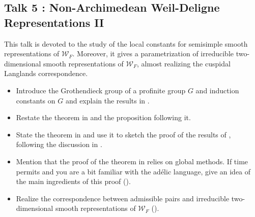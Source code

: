 \documentclass[11pt]{amsart}
\begin{document}
\subsection{Talk 5 : Non-Archimedean Weil-Deligne Representations II}

This talk is devoted to the study of the local constants for semisimple smooth representations of
$\mathcal{W}_F$. Moreover, it gives a parametrization of irreducible two-dimensional smooth representations
of $\mathcal{W}_F$, almost realizing the cuspidal Langlands correspondence.
\begin{itemize}
    \item Introduce the Grothendieck group of a profinite group $G$ and induction constants on $G$
    and explain the results in \cite[\S 30.1]{BH06}.
    \item Restate the theorem in \cite[\S 29.4]{BH06} and the proposition following it.
    \item State the theorem in \cite[\S 30.2]{BH06} and use it to sketch the proof of the results of \cite[\S 29.4]{BH06},
    following the discussion in \cite[\S 30.3-30.6]{BH06}.
    \item Mention that the proof of the theorem in \cite[\S 30.2]{BH06} relies on global methods. If time permits and you are a bit familiar with the adélic language, give an idea of the main ingredients of this proof (\cite[\S 30.7-30.9]{BH06}).
    \item Realize the correspondence between admissible pairs and irreducible two-dimensional smooth representations of $\mathcal{W}_F$ (\cite[\S 34.1]{BH06}).
\end{itemize} 






\end{document}
